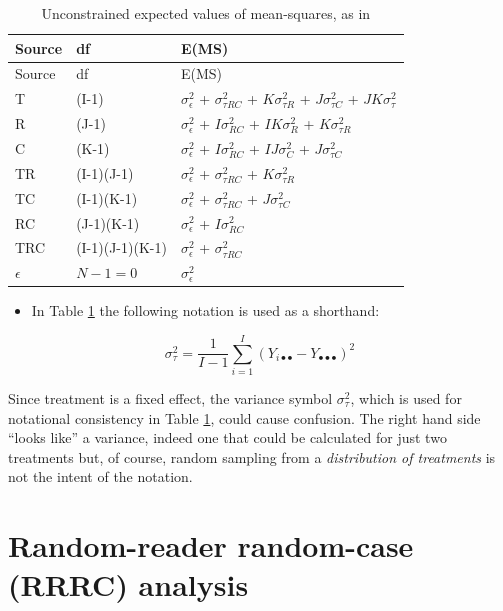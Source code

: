 \documentclass[
]{book}
\providecommand{\tightlist}{%
  \setlength{\itemsep}{0pt}\setlength{\parskip}{0pt}}
\begin{document}
\begin{longtable}[]{@{}lll@{}}
\caption{\label{tab:ExpValMs} Unconstrained expected values of mean-squares, as in \citep{RN2079}}\tabularnewline
\toprule
Source & df & E(MS)\tabularnewline
\midrule
\endfirsthead
\toprule
Source & df & E(MS)\tabularnewline
\midrule
\endhead
T & (I-1) & \(\sigma_{\epsilon}^{2}\) + \(\sigma_{\tau RC}^{2}\) + \(K\sigma_{\tau R}^{2}\) + \(J\sigma_{\tau C}^{2}\) + \(JK\sigma_{\tau}^{2}\)\tabularnewline
R & (J-1) & \(\sigma_{\epsilon}^{2}\) + \(I\sigma_{RC}^{2}\) + \(IK\sigma_{R}^{2}\) + \(K\sigma_{\tau R}^{2}\)\tabularnewline
C & (K-1) & \(\sigma_{\epsilon}^{2}\) + \(I\sigma_{RC}^{2}\) + \(IJ\sigma_{C}^{2}\) + \(J\sigma_{\tau C}^{2}\)\tabularnewline
TR & (I-1)(J-1) & \(\sigma_{\epsilon}^{2}\) + \(\sigma_{\tau RC}^{2}\) + \(K\sigma_{\tau R}^{2}\)\tabularnewline
TC & (I-1)(K-1) & \(\sigma_{\epsilon}^{2}\) + \(\sigma_{\tau RC}^{2}\) + \(J\sigma_{\tau C}^{2}\)\tabularnewline
RC & (J-1)(K-1) & \(\sigma_{\epsilon}^{2}\) + \(I\sigma_{RC}^{2}\)\tabularnewline
TRC & (I-1)(J-1)(K-1) & \(\sigma_{\epsilon}^{2}\) + \(\sigma_{\tau RC}^{2}\)\tabularnewline
\(\epsilon\) & \(N-1=0\) & \(\sigma_{\epsilon}^{2}\)\tabularnewline
\bottomrule
\end{longtable}

\begin{itemize}
\tightlist
\item
  In Table \ref{tab:ExpValMs} the following notation is used as a shorthand:
\end{itemize}

\begin{equation}
\sigma_{\tau}^{2}=\frac{1}{I-1}\sum_{i=1}^{I}\left ( Y_{i \bullet \bullet} - Y_{\bullet \bullet \bullet} \right )^2
\label{eq:defnVarTau}
\end{equation}

Since treatment is a fixed effect, the variance symbol \(\sigma_{\tau}^{2}\), which is used for notational consistency in Table \ref{tab:ExpValMs}, could cause confusion. The right hand side ``looks like'' a variance, indeed one that could be calculated for just two treatments but, of course, random sampling from a \emph{distribution of treatments} is not the intent of the notation.

\hypertarget{dbm-analysis-significance-testing-RRRC-analysis}{%
\section{Random-reader random-case (RRRC) analysis}\label{dbm-analysis-significance-testing-RRRC-analysis}}
\end{document}
